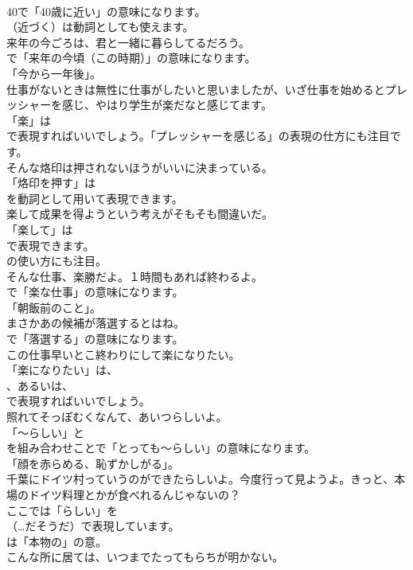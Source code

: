 \documentclass[8pt]{extreport}
\begin{document}
\begin{CJK}{UTF8}{min}
\\	40で「40歳に近い」の意味になります。
\\	（近づく）は動詞としても使えます。	
\\	来年の今ごろは、君と一緒に暮らしてるだろう。 
\\	で「来年の今頃（この時期）」の意味になります。
\\	「今から一年後」。	
\\	仕事がないときは無性に仕事がしたいと思いましたが、いざ仕事を始めるとプレッシャーを感じ、やはり学生が楽だなと感じてます。 
\\	「楽」は 
\\	で表現すればいいでしょう。「プレッシャーを感じる」の表現の仕方にも注目です。	
\\	そんな烙印は押されないほうがいいに決まっている。 
\\	「烙印を押す」は
\\	を動詞として用いて表現できます。	
\\	楽して成果を得ようという考えがそもそも間違いだ。 
\\	「楽して」は 
\\	で表現できます。
\\	の使い方にも注目。	
\\	そんな仕事、楽勝だよ。１時間もあれば終わるよ。 
\\	で「楽な仕事」の意味になります。
\\	「朝飯前のこと」。	
\\	まさかあの候補が落選するとはね。 
\\	で「落選する」の意味になります。	
\\	この仕事早いとこ終わりにして楽になりたい。 
\\	「楽になりたい」は、
\\	、あるいは、
\\	で表現すればいいでしょう。	
\\	照れてそっぽむくなんて、あいつらしいよ。 
\\	「～らしい」と
\\	を組み合わせことで「とっても～らしい」の意味になります。
\\	「顔を赤らめる、恥ずかしがる」。	
\\	千葉にドイツ村っていうのができたらしいよ。今度行って見ようよ。きっと、本場のドイツ料理とかが食べれるんじゃないの？ 
\\	ここでは「らしい」を
\\	（…だそうだ）で表現しています。
\\	は「本物の」の意。	
\\	こんな所に居ては、いつまでたってもらちが明かない。 

\end{CJK}
\end{document}
